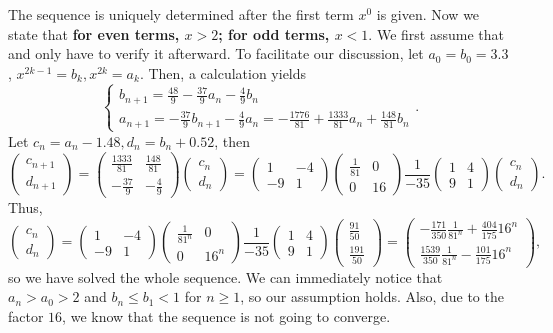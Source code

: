 \documentclass[a4 paper,12pt]{article}
\begin{document}
The sequence is uniquely determined after the first term $x^0$ is given. Now we state that \textbf{for even terms, $x>2$; for odd terms, $x<1$}. We first assume that and only have to verify it afterward. To facilitate our discussion, let $a_0=b_0=3.3$, $x^{2k-1}=b_k,x^{2k}=a_k$. Then, a calculation yields
\[
\begin{cases}
b_{n+1}=\frac{48}{9}-\frac{37}{9}a_n-\frac{4}{9}b_n\\
a_{n+1}=-\frac{37}{9}b_{n+1}-\frac{4}{9}a_n=-\frac{1776}{81}+\frac{1333}{81}a_n+\frac{148}{81}b_n
\end{cases}.
\]Let $c_n=a_n-1.48,d_n=b_n+0.52$, then
\[
\begin{pmatrix}
c_{n+1}\\d_{n+1}
\end{pmatrix}=\begin{pmatrix}
\frac{1333}{81}&\frac{148}{81}\\
-\frac{37}{9}&-\frac{4}{9}
\end{pmatrix}\begin{pmatrix}
	c_n\\d_n
\end{pmatrix}=\begin{pmatrix}
	1&-4\\
	-9&1
	\end{pmatrix}\begin{pmatrix}
		\frac{1}{81}&0\\
		0&16
		\end{pmatrix}\frac{1}{-35}\begin{pmatrix}
			1&4\\
			9&1
			\end{pmatrix}\begin{pmatrix}
		c_n\\d_n
	\end{pmatrix}.
\]Thus,
\[
\begin{pmatrix}
	c_n\\d_n
\end{pmatrix}=	\begin{pmatrix}
	1&-4\\
	-9&1
	\end{pmatrix}\begin{pmatrix}
		\frac{1}{81^n}&0\\
		0&16^n
		\end{pmatrix}\frac{1}{-35}\begin{pmatrix}
			1&4\\
			9&1
			\end{pmatrix}\begin{pmatrix}
		\frac{91}{50}\\\frac{191}{50}
	\end{pmatrix}=\begin{pmatrix}
		-\frac{171}{350}\frac{1}{81^n}+\frac{404}{175}16^n\\
		\frac{1539}{350}\frac{1}{81^n}-\frac{101}{175}16^n
	\end{pmatrix},
\] so we have solved the whole sequence. We can immediately notice that $a_n>a_0>2$ and $b_n\le b_1<1$ for $n\ge 1$, so our assumption holds. Also, due to the factor $16$, we know that the sequence is not going to converge.
\end{document}
